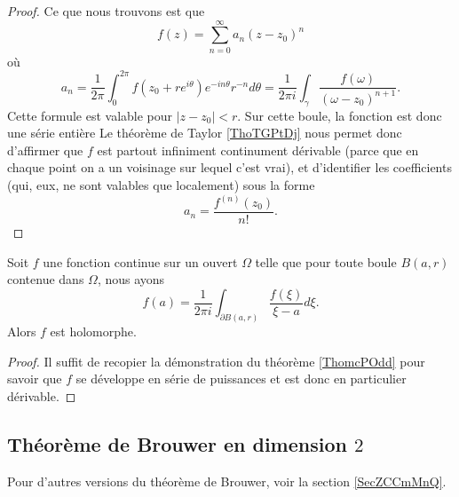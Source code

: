 \begin{proof}
    Ce que nous trouvons est que
    \begin{equation}
        f(z)=\sum_{n=0}^{\infty}a_n(z-z_0)^n
    \end{equation}
    où
    \begin{equation}
        a_n=\frac{1}{ 2\pi }\int_0^{2\pi}f(z_0+r e^{i\theta}) e^{-in\theta}r^{-n}d\theta=\frac{1}{ 2\pi i }\int_{\gamma}\frac{ f(\omega) }{ (\omega-z_0)^{n+1} }.
    \end{equation}
    Cette formule est valable pour \( | z-z_0 |<r\). Sur cette boule, la fonction est donc une série entière Le théorème de Taylor \ref{ThoTGPtDj} nous permet donc d'affirmer que \( f\) est partout infiniment continument dérivable (parce que en chaque point on a un voisinage sur lequel c'est vrai), et d'identifier les coefficients (qui, eux, ne sont valables que localement) sous la forme
    \begin{equation}
        a_n=\frac{ f^{(n)}(z_0) }{ n! }.
    \end{equation}
\end{proof}

\begin{corollary}       \label{CorwfHtJu}
    Soit \( f\) une fonction continue sur un ouvert \( \Omega\) telle que pour toute boule \( B(a,r)\) contenue dans \( \Omega\), nous ayons
    \begin{equation}
        f(a)=\frac{1}{ 2\pi i }\int_{\partial B(a,r)}\frac{ f(\xi) }{ \xi-a }d\xi.
    \end{equation}
    Alors \( f\) est holomorphe.
\end{corollary}

\begin{proof}
    Il suffit de recopier la démonstration du théorème \ref{ThomcPOdd} pour savoir que \( f\) se développe en série de puissances et est donc en particulier dérivable.
\end{proof}

\subsection{Théorème de Brouwer en dimension \texorpdfstring{$ 2$}{2}}
Pour d'autres versions du théorème de Brouwer, voir la section \ref{SecZCCmMnQ}.

